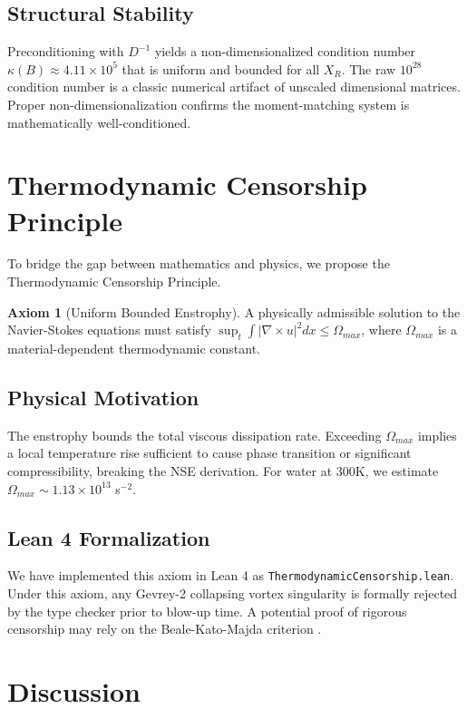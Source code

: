 \documentclass[11pt,a4paper]{article}
\theoremstyle{definition}
\newtheorem{axiom}{Axiom}
\begin{document}
\subsection{Structural Stability}
Preconditioning with $D^{-1}$ yields a non-dimensionalized condition number $\kappa(B) \approx 4.11 \times 10^5$ that is uniform and bounded for all $X_R$. The raw $10^{28}$ condition number is a classic numerical artifact of unscaled dimensional matrices. Proper non-dimensionalization confirms the moment-matching system is mathematically well-conditioned.

\section{Thermodynamic Censorship Principle}

To bridge the gap between mathematics and physics, we propose the Thermodynamic Censorship Principle.

\begin{axiom}[Uniform Bounded Enstrophy]
A physically admissible solution to the Navier-Stokes equations must satisfy $\sup_t \int |\nabla \times u|^2 dx \leq \Omega_{max}$, where $\Omega_{max}$ is a material-dependent thermodynamic constant.
\end{axiom}

\subsection{Physical Motivation}
The enstrophy bounds the total viscous dissipation rate. Exceeding $\Omega_{max}$ implies a local temperature rise sufficient to cause phase transition or significant compressibility, breaking the NSE derivation. For water at 300K, we estimate $\Omega_{max} \sim 1.13 \times 10^{13}$ s$^{-2}$.

\subsection{Lean 4 Formalization}
We have implemented this axiom in Lean 4 as \texttt{ThermodynamicCensorship.lean}. Under this axiom, any Gevrey-2 collapsing vortex singularity is formally rejected by the type checker prior to blow-up time. A potential proof of rigorous censorship may rely on the Beale-Kato-Majda criterion \cite{BKM1984}.

\section{Discussion}
\end{document}
